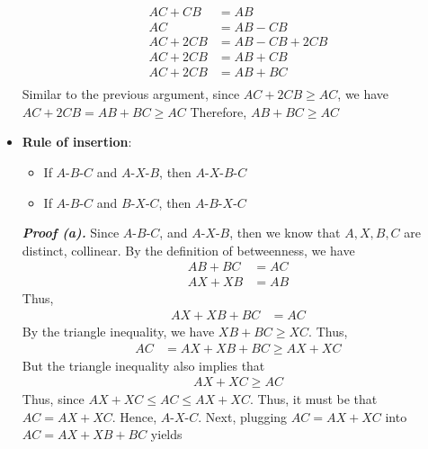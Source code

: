 \documentclass{report}
\begin{document}
\begin{itemize}
            \begin{align*}
                AC + CB &= AB \\
                AC &= AB - CB \\
                AC + 2CB &= AB - CB + 2CB \\
                AC + 2CB &= AB + CB \\
                AC + 2CB &= AB + BC \\
            \end{align*}
            Similar to the previous argument, since $AC + 2CB \geq AC$, we have $AC + 2CB = AB + BC \geq AC $
            \bigbreak \noindent 
            Therefore, $ AB + BC \geq AC$ \endpf
        \item \textbf{Rule of insertion}: 
            \begin{itemize}
                \item If $ A\text{-}B\text{-}C$ and $ A\text{-}X\text{-}B$, then $ A\text{-}X\text{-}B\text{-}C $
                \item If $ A\text{-}B\text{-}C$ and $ B\text{-}X\text{-}C$, then $ A\text{-}B\text{-}X\text{-}C $
            \end{itemize}
            \bigbreak \noindent 
            \textbf{\textit{Proof (a).}} Since $ A\text{-}B\text{-}C$, and $ A\text{-}X\text{-}B$, then we know that $A,X,B,C$ are distinct, collinear. 
            \bigbreak \noindent 
            By the definition of betweenness, we have
            \begin{align*}
                AB  + BC &= AC \\
                AX + XB &= AB
            \end{align*}
            Thus,
            \begin{align*}
                AX + XB + BC &= AC
            \end{align*}
            By the triangle inequality, we have $XB + BC \geq XC$. Thus,
            \begin{align*}
                AC & =AX + XB +  BC \geq AX + XC
            \end{align*}
            But the triangle inequality also implies that 
            \begin{align*}
                AX + XC \geq AC
            \end{align*}
            Thus, since $AX + XC \leq AC \leq AX + XC$. Thus, it must be that $AC = AX + XC$. Hence, $ A\text{-}X\text{-}C $. Next, plugging $AC = AX + XC$ into $AC = AX + XB + BC$ yields
            \begin{align*}

\end{align*}
\end{itemize}
\end{document}

